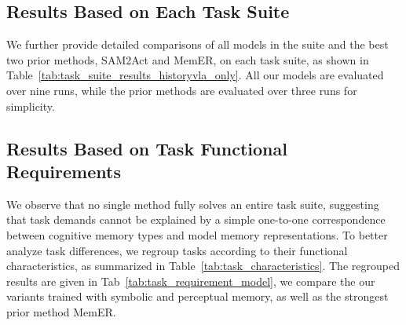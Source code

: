 \clearpage
\subsection{Results Based on Each Task Suite}
\label{sec:results_suite_breakdown}

We further provide detailed comparisons of all models in the \modelname\xspace suite and the best two prior methods, SAM2Act and MemER, on each task suite, as shown in Table~\ref{tab:task_suite_results_historyvla_only}. 
All our \modelname\xspace models are evaluated over nine runs, while the prior methods are evaluated over three runs for simplicity.




\clearpage
\subsection{Results Based on Task Functional Requirements}
\label{sec:result_task_function}

We observe that no single method fully solves an entire task suite, suggesting that task demands cannot be explained by a simple one-to-one correspondence between cognitive memory types and model memory representations. 
To better analyze task differences, we regroup tasks according to their functional characteristics, as summarized in Table~\ref{tab:task_characteristics}. The regrouped results are given in Tab~\ref{tab:task_requirement_model}, we compare the our \modelname\xspace variants trained with symbolic and perceptual memory, as well as the strongest prior method MemER.

